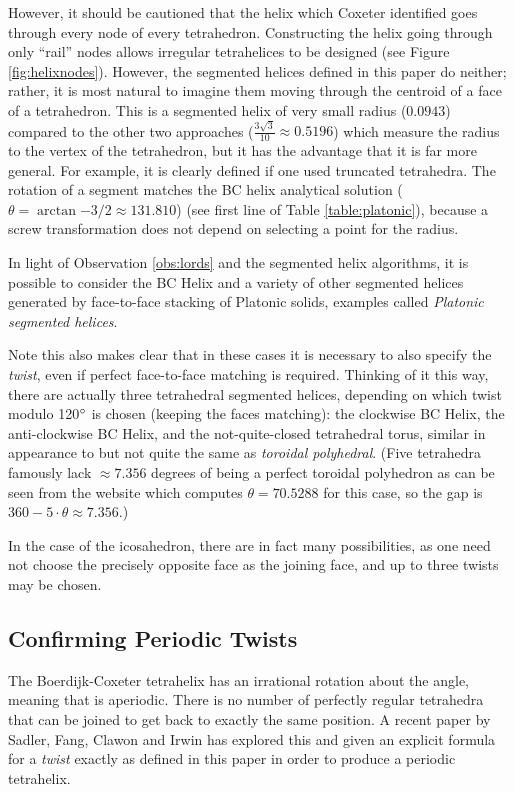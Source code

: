 \documentclass{svproc}
\begin{document}
However, it should be cautioned that the helix which Coxeter identified\cite{coxeter1985simplicial}
goes through every node of every tetrahedron. Constructing the helix going
through only ``rail'' nodes allows irregular tetrahelices to be designed\cite{read2018transforming}
(see Figure \ref{fig:helixnodes}).
However, the segmented helices defined in this paper do neither; rather, it is most natural to
imagine them moving through the centroid of a face of a tetrahedron.
This is a segmented helix of
very small radius ($0.0943$) compared to the other two approaches
($\frac{3\sqrt{3}}{10} \approx 0.5196$) which measure the radius to the
vertex of the tetrahedron, but it has
the advantage that it is far more general. For example, it is
clearly defined if one used truncated tetrahedra.
The rotation of a
segment matches the BC helix analytical solution
($\theta = \arctan{-3/2} \approx 131.810$) (see first line of Table \ref{table:platonic}),
because a screw transformation does not depend on selecting a point for the radius.

In light of Observation \ref{obs:lords} and the segmented helix algorithms, it is possible to
consider the BC Helix and a variety of other segmented helices generated by
face-to-face stacking of Platonic solids, examples called {\em Platonic segmented helices}.

Note this also makes clear that in these cases it is necessary to also specify the {\em twist},
even if perfect face-to-face matching is required.
Thinking of it this
way, there are actually three tetrahedral segmented helices,
depending on which twist modulo 120$\degree$
is chosen (keeping the faces matching): the clockwise BC Helix, the anti-clockwise BC Helix, and the
not-quite-closed tetrahedral torus, similar in appearance to but not quite the same as
{\em toroidal polyhedral}.
(Five tetrahedra famously lack $\approx 7.356$ degrees of being a perfect toroidal polyhedron
as can be seen from the website which computes $\theta = 70.5288$ for this case,
so the gap is $360 - 5 \cdot \theta \approx 7.356$.)

In the case of the icosahedron, there are in fact many possibilities,
as one need not choose the precisely opposite face as the joining face, and
up to three twists may be chosen.


\subsection{Confirming Periodic Twists}

The Boerdijk-Coxeter tetrahelix has an irrational rotation about the angle,
meaning that is aperiodic.
There is no number of perfectly regular tetrahedra that can be joined to get back to exactly
the same position.
A recent paper by Sadler, Fang, Clawon and Irwin\cite{sadler2019periodic} has explored this
and given an explicit formula for a {\em twist} exactly as defined in this
paper in order to produce a periodic tetrahelix.
\end{document}
